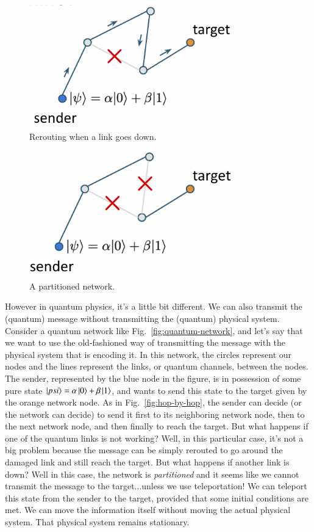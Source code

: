 \begin{figure}[H]
    \centering
    \includegraphics[width=0.8\textwidth]{lesson8/link-down.png}
        \caption{Rerouting when a link goes down.}
    \label{fig:link-down}
\end{figure}
\begin{figure}[H]
    \centering
    \includegraphics[width=0.8\textwidth]{lesson8/partitioned.png}
        \caption{A partitioned network.}
    \label{fig:partition}
\end{figure}


However in quantum physics, it's a little bit different. We can also transmit the (quantum) message without transmitting the (quantum) physical system. Consider a quantum network like Fig.~\ref{fig:quantum-network}, and let's say that we want to use the old-fashioned way of transmitting the message with the physical system that is encoding it. In this network, the circles represent our nodes and the lines represent the links, or quantum channels, between the nodes. The sender, represented by the blue node in the figure, is in possession of some pure state $\left| psi \right\rangle = \alpha\left| 0 \right\rangle+\beta\left| 1 \right\rangle$, and  wants to send this state to the target given by the orange network node. As in Fig.~\ref{fig:hop-by-hop}, the sender can decide (or the network can decide) to send it first to its neighboring network node, then to the next network node, and then finally to reach the target. But what happens if one of the quantum links is not working? Well, in this particular case, it's not a big problem because the message can be simply rerouted to go around the damaged link and still reach the target. But what happens if another link is down? Well in this case, the network is \emph{partitioned} and it seems like we cannot transmit the message to the target...unless we use teleportation! We can teleport this state from the sender to the target, provided that some initial conditions are met. We can move the information itself without moving the actual physical system. That physical system remains stationary.

